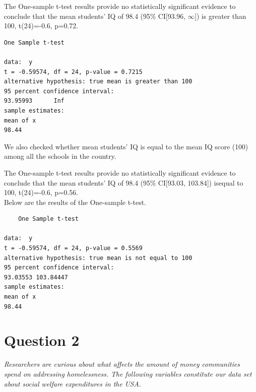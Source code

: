 \documentclass[12pt,letterpaper]{article}
\begin{document}
\noindent The One-sample t-test results provide no statistically significant evidence to conclude that the mean students' IQ of 98.4 (95\% CI[93.96, $\infty$]) is greater than 100, t(24)=-0.6, p=0.72.\\

\begin{verbatim}
One Sample t-test

data:  y
t = -0.59574, df = 24, p-value = 0.7215
alternative hypothesis: true mean is greater than 100
95 percent confidence interval:
93.95993      Inf
sample estimates:
mean of x 
98.44 
\end{verbatim}
\vspace{.2cm}

\noindent We also checked whether mean students' IQ is equal to the mean IQ score (100) among all the schools in the country. 
\vspace{.2cm}

  
\vspace{.2cm}

\noindent  The One-sample t-test results provide no statistically significant evidence to conclude that the mean students' IQ of 98.4 (95\% CI[93.03, 103.84]) isequal to 100, t(24)=-0.6, p=0.56.\\
Below are the results of the One-sample t-test.\\

\begin{verbatim}
	One Sample t-test

data:  y
t = -0.59574, df = 24, p-value = 0.5569
alternative hypothesis: true mean is not equal to 100
95 percent confidence interval:
93.03553 103.84447
sample estimates:
mean of x 
98.44 
\end{verbatim}
\vspace{.2cm}

\section*{Question 2}

\noindent \textit{Researchers are curious about what affects the amount of money communities spend on addressing homelessness. The following variables constitute our data set about social welfare expenditures in the USA.}\\
\end{document}
